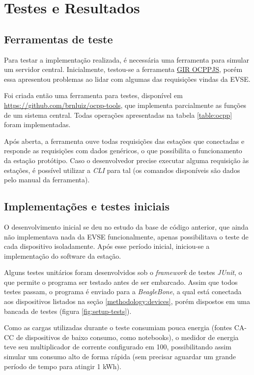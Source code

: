 \chapter{Testes e Resultados}
\label{tests:tests}

  \section{Ferramentas de teste}
  \label{tests:tools}

    Para testar a implementação realizada, é necessária uma ferramenta para simular um servidor central. Inicialmente, testou-se a ferramenta \href{http://www.gir.fr/ocppjs/}{GIR OCPPJS}, porém essa apresentou problemas ao lidar com algumas das requisições vindas da \ac{EVSE}.

    Foi criada então uma ferramenta para testes, disponível em \url{https://github.com/brnluiz/ocpp-tools}, que implementa parcialmente as funções de um sistema central. Todas operações apresentadas na tabela \ref{table:ocpp} foram implementadas.

    Após aberta, a ferramenta ouve todas requisições das estações que conectadas e responde as requisições com dados genéricos, o que possibilita o funcionamento da estação protótipo. Caso o desenvolvedor precise executar alguma requisição às estações, é possível utilizar a \textit{\ac{CLI}} para tal (os comandos disponíveis são dados pelo manual da ferramenta).

  \section{Implementações e testes iniciais}
  \label{tests:initial}

    O desenvolvimento inicial se deu no estudo da base de código anterior, que ainda não implementava nada da \ac{EVSE} funcionalmente, apenas possibilitava o teste de cada dispositivo isoladamente. Após esse período inicial, iniciou-se a implementação do software da estação.

    Alguns testes unitários foram desenvolvidos sob o \textit{framework} de testes \textit{JUnit}, o que permite o programa ser testado antes de ser embarcado. Assim que todos testes passam, o programa é enviado para a \textit{BeagleBone}, a qual está conectada aos dispositivos listados na seção \ref{methodology:devices}, porém dispostos em uma bancada de testes (figura \ref{fig:setup-tests}).

    Como as cargas utilizadas durante o teste consumiam pouca energia (fontes \ac{CA}-\ac{CC} de dispositivos de baixo consumo, como notebooks), o medidor de energia teve seu multiplicador de corrente configurado em 100, possibilitando assim simular um consumo alto de forma rápida (sem precisar aguardar um grande período de tempo para atingir 1 kWh).


